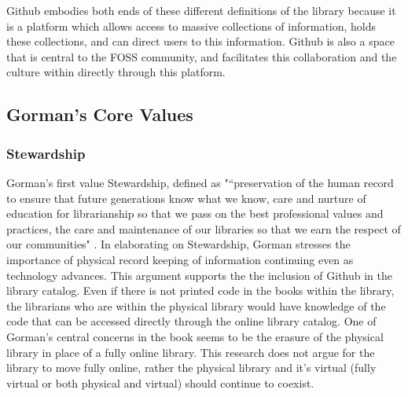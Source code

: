 Github embodies both ends of these different definitions of the library because it is a platform which allows access to massive collections of information, holds these collections, and can direct users to this information. Github is also a space that is central to the FOSS community, and facilitates this collaboration and the culture within directly through this platform. 

\subsection{Gorman's Core Values}

\subsubsection{Stewardship}

Gorman's first value Stewardship, defined as "“preservation of the human record to ensure that future generations know what we know, care and nurture of education for librarianship so that we pass on the best professional values and practices, the care and maintenance of our libraries so that we earn the respect of our communities" \cite{gorman2000values}. In elaborating on Stewardship, Gorman stresses the importance of physical record keeping of information continuing even as technology advances. This argument supports the the inclusion of Github in the library catalog. Even if there is not printed code in the books within the library, the librarians who are within the physical library would have knowledge of the code that can be accessed directly through the online library catalog. One of Gorman's central concerns in the book seems to be the erasure of the physical library in place of a fully online library. This research does not argue for the library to move fully online, rather the physical library and it's virtual (fully virtual or both physical and virtual) should continue to coexist. 

